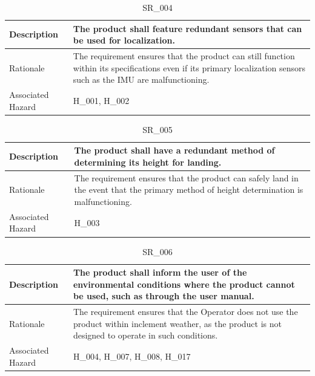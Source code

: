 \documentclass{article}
\begin{document}
\begin{table}[!h]
\begin{center}
\caption {SR\_004} 
\label{SR_004}
\begin{tabular}{ | m{3cm} | m{11cm} | }
\hline
Description & The product shall feature redundant sensors that can be used for localization.
 \\
\hline
Rationale & The requirement ensures that the product can still function within its specifications even if its primary localization sensors such as the IMU are malfunctioning. \\
\hline
Associated Hazard & H\_001, H\_002 \\
\hline
\end{tabular}
\end{center}
\end{table}

\begin{table}[!h]
\begin{center}
\caption {SR\_005} 
\label{SR_005}
\begin{tabular}{ | m{3cm} | m{11cm} | }
\hline
Description & The product shall have a redundant method of determining its height for landing.
 \\
\hline
Rationale & The requirement ensures that the product can safely land in the event that the primary method of height determination is malfunctioning. \\
\hline
Associated Hazard & H\_003 \\
\hline
\end{tabular}
\end{center}
\end{table}

\begin{table}[!h]
\begin{center}
\caption {SR\_006} 
\label{SR_006}
\begin{tabular}{ | m{3cm} | m{11cm} | }
\hline
Description & The product shall inform the user of the environmental conditions where the product cannot be used, such as through the user manual. \\
\hline
Rationale & The requirement ensures that the Operator does not use the product within inclement weather, as the product is not designed to operate in such conditions. \\
\hline
Associated Hazard & H\_004, H\_007, H\_008, H\_017 \\
\hline
\end{tabular}
\end{center}
\end{table}
\end{document}
